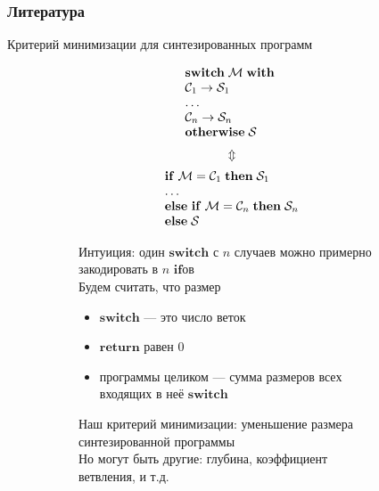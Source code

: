 \documentclass[aspectratio=169
  , xcolor={svgnames}
  , hyperref={ colorlinks,citecolor=Blue
             , linkcolor=DarkRed,urlcolor=DarkBlue}
  , russian
  ]{beamer}
\newcommand{\primi}[1]{\ensuremath{\mathbf{#1}}}
\newcommand{\ir}{\ensuremath{\mathcal{S}}}
\begin{document}
\begin{frame}%
\frametitle{Литература}


\vspace{1cm}
\end{frame}


\begin{frame}{Критерий минимизации для синтезированных программ}
\begin{figure}
\begin{subfigure}[b]{0.3\linewidth}
\[
  \begin{array}{l}
  \primi{switch}\;\mathcal{M}\;\primi{with}\; \\
  \mathcal{C}_1\; \primi{\rightarrow}\; \ir_1\\
  \dots \\
  \mathcal{C}_n\; \primi{\rightarrow}\; \ir_n\\
  \primi{otherwise}\;\ir\\
  \end{array}\\
\]
\[
  \Updownarrow
\]
\[
  \begin{array}{l}
  \primi{if}\; \mathcal{M} = \mathcal{C}_1\;\primi{then}\; \ir_1\\
  \dots \\
  \primi{else\ if}\; \mathcal{M} = \mathcal{C}_n\; \primi{then}\;  \ir_n\\
  \primi{else}\;\ir\\
  \end{array}\\
\]
\vspace{1cm}

\end{subfigure}
\hspace{1cm}
\begin{subfigure}[b]{0.6\linewidth}
Интуиция: один \primi{switch} с $n$ случаев можно примерно закодировать в  $n$ \primi{if}ов\\

Будем считать, что размер
\begin{itemize}
\item \primi{switch} --- это число веток
\item \primi{return} равен 0
\item программы целиком --- сумма размеров всех входящих в неё \primi{switch}
\end{itemize}
Наш критерий минимизации: уменьшение размера синтезированной программы \\

Но могут быть другие: глубина, коэффициент ветвления, и т.д.
\end{subfigure}
\end{figure}

\end{frame}
\end{document}
